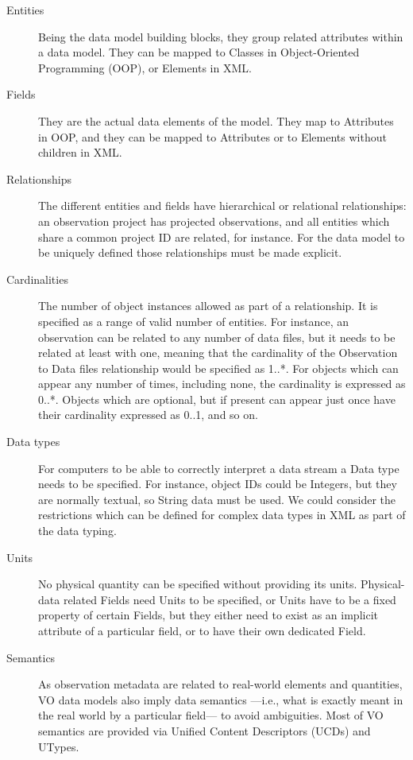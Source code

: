		\begin{description}
			\item[Entities] Being the data model building blocks,
			they group related attributes within a data model. They
			can be mapped to Classes in Object-Oriented Programming
			(OOP), or Elements in XML.
			
			 \item[Fields] They are the actual data elements of the
			model. They map to Attributes in OOP, and they can be
			mapped to Attributes or to Elements without children in
			XML.
			
			 \item[Relationships] The different entities and fields
			have hierarchical or relational relationships: an
			observation project has projected observations, and
			all entities which share a common project ID are
			related, for instance. For the data model to be
			uniquely defined those relationships must be made
			explicit.
			
			 \item[Cardinalities] The number of object instances
			allowed as part of a relationship. It is specified as
			a range of valid number of entities.
			For instance, an
			observation can be related to any number of data files,
			but it needs to be related at least with one, meaning
			that the cardinality of the Observation to Data files
			relationship would be specified as 1..*. For objects
			which can appear any number of times, including none,
			the cardinality is expressed as 0..*. Objects which are
			optional, but if present can appear just once have their 
			cardinality expressed as 0..1, and so on.
			
			 \item[Data types] For computers to be able to
			correctly interpret a data stream a Data type needs to
			be specified. For instance, object IDs could be
			Integers, but they are normally textual, so String data
			must be used. We could consider the restrictions which
			can be defined for complex data types in XML as part of
			the data typing.
			
			 \item[Units] No physical quantity can be specified
			without providing its units. Physical-data related
			Fields need Units to be specified, or Units have to be
			a fixed property of certain Fields, but they either
			need to exist as an implicit attribute of a particular
			field, or to have their own dedicated Field.
			
			 \item[Semantics] As observation metadata are related
			to real-world elements and quantities, VO data models
			also imply data semantics ---i.e., what is exactly meant
			in the real world by a particular field--- to avoid
			ambiguities. Most of VO semantics are provided via
			Unified Content Descriptors (UCDs) and UTypes.
		\end{description}

